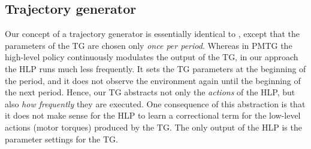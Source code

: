 \documentclass[conference]{IEEEtran}
\begin{document}
\subsection{Trajectory generator} \label{sec:tg}

Our concept of a trajectory generator is essentially identical to \citet{iscen2018pmtg}, except that the parameters of the TG are chosen only \emph{once per period}.
Whereas in PMTG the high-level policy continuously modulates the output of the TG, in our approach the HLP runs much less frequently.
It sets the TG parameters at the beginning of the period, and it does not observe the environment again until the beginning of the next period.
Hence, our TG abstracts not only the \emph{actions} of the HLP, but also \emph{how frequently} they are executed.
One consequence of this abstraction is that it does not make sense for the HLP to learn a correctional term for the low-level actions (motor torques) produced by the TG.
The only output of the HLP is the parameter settings for the TG.
\end{document}
